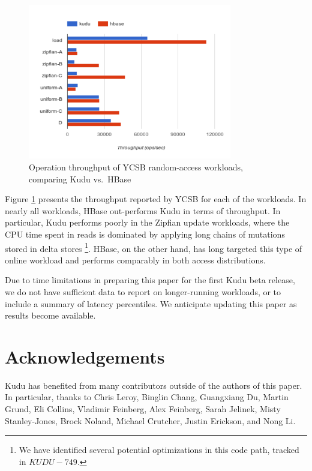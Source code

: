 \documentclass{vldb}
\begin{document}
\begin{figure}
  \includegraphics[width=3.5in]{ycsb-results.pdf}
  \caption{Operation throughput of YCSB random-access workloads, comparing Kudu vs.\ HBase}
  \label{fig:ycsb_throughput}
\end{figure}

Figure \ref{fig:ycsb_throughput} presents the throughput reported by YCSB for each of the
workloads. In nearly all workloads, HBase out-performs Kudu in terms of throughput. In
particular, Kudu performs poorly in the Zipfian update workloads, where the CPU time
spent in reads is dominated by applying long chains of mutations stored in delta stores
\footnote{We have identified several potential optimizations in this code path, tracked
in $KUDU-749$.}. HBase, on the other hand, has long targeted this type of online workload
and performs comparably in both access distributions.

Due to time limitations in preparing this paper for the first Kudu beta release, we do
not have sufficient data to report on longer-running workloads, or to include a summary
of latency percentiles. We anticipate updating this paper as results become available.


\section{Acknowledgements}
Kudu has benefited from many contributors outside of the authors of this paper. In particular, thanks to Chris Leroy, Binglin Chang, Guangxiang Du, Martin Grund, Eli Collins, Vladimir Feinberg, Alex Feinberg, Sarah Jelinek, Misty Stanley-Jones, Brock Noland, Michael Crutcher, Justin Erickson, and Nong Li.



\end{document}
